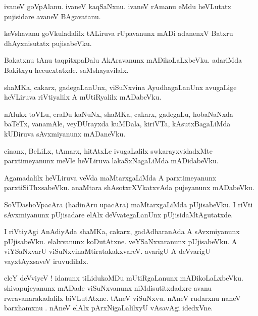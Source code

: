 \documentclass{article}
\begin{document}
\begin{mn}%
ivaneV goVpAlanu. ivaneV kaqSaNxnu. ivaneV rAmanu eMdu heVLutatx pujisidare avaneV BAgavatanu.
\end{mn}

\begin{mn}%
keVshavanu goVkuladalilx tALiruva rUpavanunx mADi adanenxV Batxru dhAyxnisutatx pujisabeVku.
\end{mn}

\begin{mn}%
Bakatxnu tAnu taqpitxpaDalu AkAravanunx mADikoLaLxbeVku. adariMda Bakitxyu hecucxtatxde. 
saMshayavilalx.
\end{mn}

\begin{mn}%
shaMKa, cakarx, gadegaLanUnx, viSuNxvina AyudhagaLanUnx avugaLige heVLiruva riVtiyalilx A 
mUtiRyalilx mADabeVku.
\end{mn}

\begin{mn}%
nAlukx toVLu, eraDu kaNuNx, shaMKa, cakarx, gadegaLu, hobaNaNxda baTeTx, vanamAle, veyDUrayxda 
kuMDala, kiriVTa, kAsutxBagaLiMda kUDiruva sAvxmiyanunx mADaneVku.
\end{mn}

\begin{mn}%
cinanx, BeLiLx, tAmarx, hitAtxLe ivugaLalilx swkarayxvidadxMte parxtimeyanunx meVle heVLiruva 
lakaSxNagaLiMda mADidabeVku.
\end{mn}

\begin{mn}%
Agamadalilx heVLiruva veVda maMtarxgaLiMda A parxtimeyanunx parxtiSiThxsabeVku. anaMtara 
shAsotxrXVkatxvAda pujeyanunx mADabeVku.
\end{mn}

\begin{mn}%
SoVDashoVpacAra (hadinAru upacAra) maMtarxgaLiMda pUjisabeVku. I riVti sAvxmiyanunx pUjisadare 
elAlx deVvategaLanUnx pUjisidaMtAgutatxde.
\end{mn}

\begin{mn}%
I riVtiyAgi AnAdiyAda shaMKa, cakarx, gadAdharanAda A sAvxmiyanunx pUjisabeVku. elalxvanunx 
koDutAtxne. veYSaNxvaranunx pUjisabeVku. A viYSaNxvarU viSuNxvinaMtiratakakxvareV. avarigU A 
deVvarigU vayxtAyxsaveV iruvudilalx.
\end{mn}

\begin{mn}%
eleY deVviyeV ! idanunx tiLidukoMDu mUtiRgaLanunx mADikoLaLxbeVku. shivapujeyanunx mADade 
viSuNxvanunx niMdisutitxdadxre avanu rwravanarakadalilx biVLutAtxne. tAneV viSuNxvu. nAneV rudarxnu 
naneV barxhamxnu . nAneV elAlx pArxNigaLalilxyU vAsavAgi idedxVne.
\end{mn}
\end{document}
